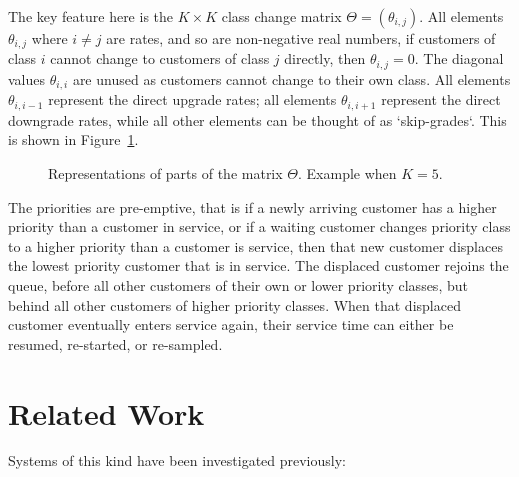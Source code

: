 \documentclass{article}
\begin{document}
The key feature here is the $K \times K$ class change matrix
$\Theta = (\theta_{i,j})$. All elements $\theta_{i,j}$ where $i \neq j$ are
rates, and so are non-negative real numbers, if customers of class $i$ cannot
change to customers of class $j$ directly, then $\theta_{i,j} = 0$. The diagonal
values $\theta_{i,i}$ are unused as customers cannot change to their own class.
All elements $\theta_{i,i-1}$ represent the direct upgrade rates; all elements
$\theta_{i,i+1}$ represent the direct downgrade rates, while all other elements
can be thought of as `skip-grades`.
This is shown in Figure~\ref{fig:skipgrades}.

\begin{figure}
\begin{center}

\end{center}
\caption{Representations of parts of the matrix $\Theta$. Example when $K=5$.}
\label{fig:skipgrades}
\end{figure}

The priorities are pre-emptive, that is if a newly arriving customer has a
higher priority than a customer in service, or if a waiting customer changes
priority class to a higher priority than a customer is service, then that new
customer displaces the lowest priority customer that is in service. The
displaced customer rejoins the queue, before all other customers of their own or
lower priority classes, but behind all other customers of higher priority
classes. When that displaced customer eventually enters service again, their
service time can either be resumed, re-started, or re-sampled.


\section{Related Work}\label{sec:related}
Systems of this kind have been investigated previously:
\end{document}

